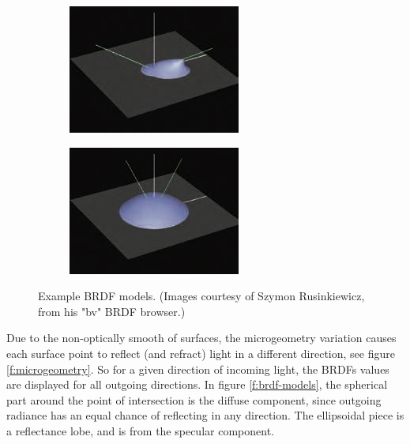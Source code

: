 \begin{figure}
\begin{center}
\begin{subfigure}[b]{0.325\textwidth}
		\includegraphics[width=1.\textwidth]{graphics/gi/ray-optics-8-5}
	\end{subfigure}
	\begin{subfigure}[b]{0.325\textwidth}
		\includegraphics[width=1.\textwidth]{graphics/gi/ray-optics-8-6}
	\end{subfigure}
\end{center}
\caption{Example BRDF models. (Images courtesy of Szymon Rusinkiewicz, from his "bv" BRDF browser.)}
\end{figure}

Due to the non-optically smooth of surfaces, the microgeometry variation causes each surface point to reflect (and refract) light in a different direction, see figure \ref{f:microgeometry}. So for a given direction of incoming light, the BRDFs values are displayed for all outgoing directions. In figure \ref{f:brdf-models}, the spherical part around the point of intersection is the diffuse component, since outgoing radiance has an equal chance of reflecting in any direction. The ellipsoidal piece is a reflectance lobe, and is from the specular component.

